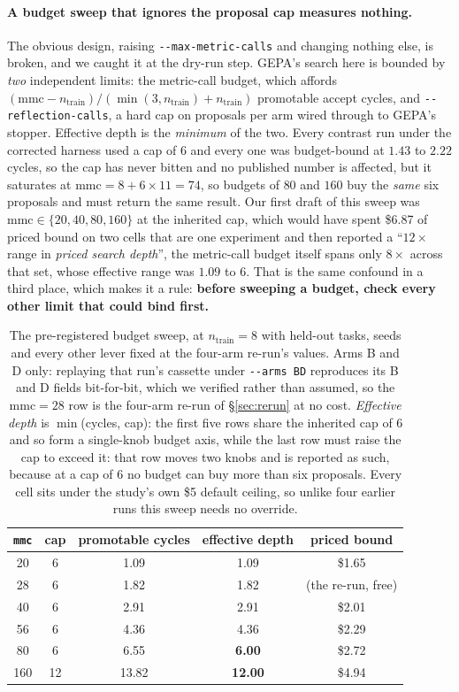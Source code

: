 \documentclass[11pt]{article}
\begin{document}
\paragraph{A budget sweep that ignores the proposal cap measures nothing.} The obvious design,
raising \texttt{-{}-max-metric-calls} and changing nothing else, is broken, and we caught it at the
dry-run step. GEPA's search here is bounded by \emph{two} independent limits: the metric-call
budget, which affords $(\mathrm{mmc} - n_{\mathrm{train}})/(\min(3,
n_{\mathrm{train}}) + n_{\mathrm{train}})$ promotable accept cycles, and
\texttt{-{}-reflection-calls}, a hard cap on proposals per arm wired through to GEPA's stopper.
Effective depth is the \emph{minimum} of the two. Every contrast run under the corrected harness
used a cap of $6$ and every one was budget-bound at $1.43$ to $2.22$ cycles, so the cap has never
bitten and no published number is affected, but it saturates at
$\mathrm{mmc} = 8 + 6 \times 11 = 74$, so budgets of $80$ and $160$ buy the \emph{same} six
proposals and must return the same result. Our first draft of this sweep was
$\mathrm{mmc} \in \{20,40,80,160\}$ at the inherited cap, which would have spent \$6.87 of priced
bound on two cells that are one experiment and then reported a ``$12\times$ range in \emph{priced
search depth}'', the metric-call budget itself spans only $8\times$ across that set, whose
effective range was $1.09$ to $6$. That is the same confound in a third place, which makes it a
rule: \textbf{before sweeping a budget, check every other limit that could bind first.}

\begin{table}[h]
\centering
\small
\begin{tabular}{ccccc}
\toprule
\texttt{mmc} & cap & promotable cycles & effective depth & priced bound \\
\midrule
20  & 6  & 1.09  & 1.09 & \$1.65 \\
28  & 6  & 1.82  & 1.82 & (the re-run, free) \\
40  & 6  & 2.91  & 2.91 & \$2.01 \\
56  & 6  & 4.36  & 4.36 & \$2.29 \\
80  & 6  & 6.55  & \textbf{6.00} & \$2.72 \\
160 & 12 & 13.82 & \textbf{12.00} & \$4.94 \\
\bottomrule
\end{tabular}
\caption{The pre-registered budget sweep, at $n_{\mathrm{train}} = 8$ with held-out tasks, seeds
and every other lever fixed at the four-arm re-run's values. Arms B and D only: replaying that
run's cassette under \texttt{-{}-arms BD} reproduces its B and D fields bit-for-bit, which we
verified rather than assumed, so the $\mathrm{mmc}{=}28$ row is the four-arm re-run of \S\ref{sec:rerun} at no cost. \emph{Effective depth} is
$\min$(cycles, cap): the first five rows share the inherited cap of $6$ and so form a
single-knob budget axis, while the last row must raise the cap to exceed it: that row moves
two knobs and is reported as such, because at a cap of $6$ no budget can buy more than six
proposals. Every cell sits under the study's own \$5 default ceiling, so unlike four earlier runs
this sweep needs no override.}
\label{tab:budgetsweep}
\end{table}
\end{document}

